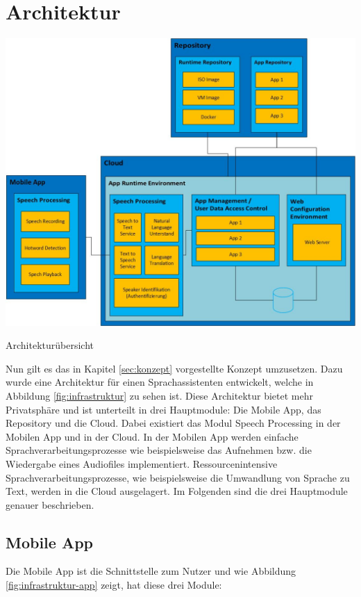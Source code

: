 \section{Architektur}\label{sec:architecure}
\captionsetup[table]{name=Abbildung}
\renewcommand\thetable{11}
\begin{table}[!h]
	\centering
	\includegraphics[width=1\linewidth]{Picture/Infrastruktur.jpg}
	\caption[Architekturübersicht]{Architekturübersicht}
	\label{fig:infrastruktur}
\end{table}

Nun gilt es das in Kapitel \ref{sec:konzept} vorgestellte Konzept umzusetzen. Dazu wurde eine Architektur für einen Sprachassistenten entwickelt, welche in Abbildung \ref{fig:infrastruktur} zu sehen ist. 
Diese Architektur bietet mehr Privatsphäre und ist unterteilt in drei Hauptmodule: Die Mobile App, das Repository und die Cloud. Dabei existiert das Modul \glqq Speech Processing\grqq{} in der Mobilen App und in der Cloud. In der Mobilen App werden einfache Sprachverarbeitungsprozesse wie beispielsweise das Aufnehmen bzw. die Wiedergabe eines Audiofiles implementiert. Ressourcenintensive Sprachverarbeitungsprozesse, wie beispielsweise die Umwandlung von Sprache zu Text, werden in die Cloud ausgelagert. Im Folgenden sind die drei Hauptmodule genauer beschrieben.

\subsection{Mobile App}
Die Mobile App ist die Schnittstelle zum Nutzer und wie Abbildung \ref{fig:infrastruktur-app} zeigt, hat diese drei Module:

